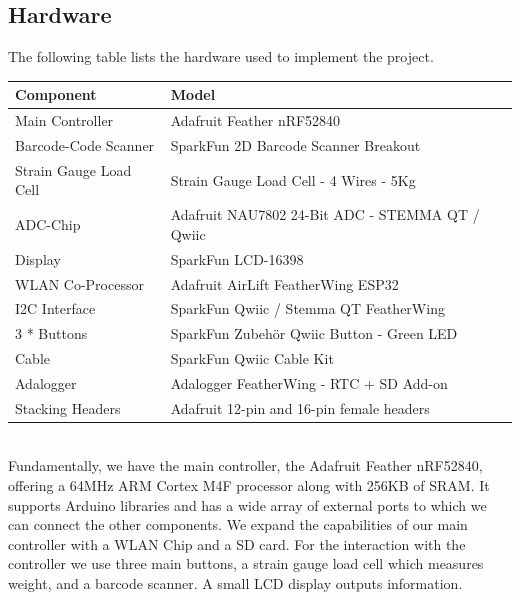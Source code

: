 \documentclass{article}
\begin{document}
\subsection{Hardware}
The following table lists the hardware used to implement the project.
\\[10pt]
\begin{tabular}{l l}
	\hline
	Component              & Model                                           \\
	\hline
	Main Controller        & Adafruit Feather nRF52840                       \\
	Barcode-Code Scanner   & SparkFun 2D Barcode Scanner Breakout            \\
	Strain Gauge Load Cell & Strain Gauge Load Cell - 4 Wires - 5Kg          \\
	ADC-Chip               & Adafruit NAU7802 24-Bit ADC - STEMMA QT / Qwiic \\
	Display                & SparkFun LCD-16398                              \\
	WLAN Co-Processor      & Adafruit AirLift FeatherWing ESP32              \\
	I2C Interface          & SparkFun Qwiic / Stemma QT FeatherWing          \\
	3 * Buttons            & SparkFun Zubehör Qwiic Button - Green LED       \\
	Cable                  & SparkFun Qwiic Cable Kit                        \\
	Adalogger              & Adalogger FeatherWing - RTC + SD Add-on         \\
	Stacking Headers       & Adafruit 12-pin and 16-pin female headers       \\
	\hline
\end{tabular} \\[10pt]
Fundamentally, we have the main controller, the Adafruit Feather nRF52840, offering a 64MHz ARM Cortex M4F processor along with 256KB of SRAM.
It supports Arduino libraries and has a wide array of external ports to which we can connect the other components.
We expand the capabilities of our main controller with a WLAN Chip and a SD card.
For the interaction with the controller we use three main buttons, a strain gauge load cell which measures weight, and a barcode scanner.
A small LCD display outputs information.
\end{document}
